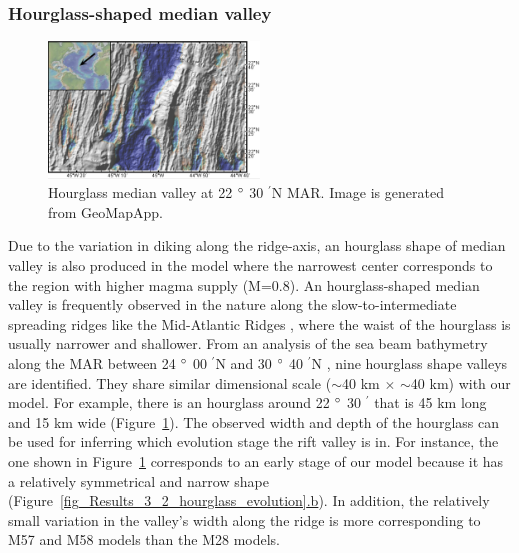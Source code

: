 \subsubsection{Hourglass-shaped median valley}

\begin{figure}[h]
  \centering
    \includegraphics[width=0.5\textwidth]{./Figures/fig_Discussion_Observation_4_hourglass_22N_MAR.eps}
  \caption[Hourglass median valley at 22 $\degree$ 30 $^{\prime}$N MAR.]{Hourglass median valley at 22 $\degree$ 30 $^{\prime}$N MAR. Image is generated from GeoMapApp.}
 \label{fig_Discussion_Observation_4_hourglass_22N_MAR}
\end{figure}   

Due to the variation in diking along the ridge-axis, an hourglass shape of median valley is also produced in the model where the narrowest center corresponds to the region with higher magma supply (M=$0.8$). An hourglass-shaped median valley is frequently observed in the nature along the slow-to-intermediate spreading ridges like the Mid-Atlantic Ridges \citep{Sempere1993}, where the waist of the hourglass is usually narrower and shallower. From an analysis of the sea beam bathymetry along the MAR between 24 $\degree$ 00 $^{\prime}$N and 30 $\degree$ 40 $^{\prime}$N \citep{Sempere1993}, nine hourglass shape valleys are identified. They share similar dimensional scale ($\sim$40 km $\times$ $\sim$40 km) with our model. For example, there is an hourglass around 22 $\degree$ 30 $^{\prime}$ that is 45 km long and 15 km wide (Figure~\hyperref[fig_Discussion_Observation_4_hourglass_22N_MAR]{\ref{fig_Discussion_Observation_4_hourglass_22N_MAR}}). The observed width and depth of the hourglass can be used for inferring which evolution stage the rift valley is in. For instance, the one shown in Figure~\hyperref[fig_Discussion_Observation_4_hourglass_22N_MAR]{\ref{fig_Discussion_Observation_4_hourglass_22N_MAR}} corresponds to an early stage of our model because it has a relatively symmetrical and narrow shape (Figure~\hyperref[fig_Results_3_2_hourglass_evolution]{\ref{fig_Results_3_2_hourglass_evolution}.b}). In addition, the relatively small variation in the valley's width along the ridge is more corresponding to M57 and M58 models than the M28 models. 

